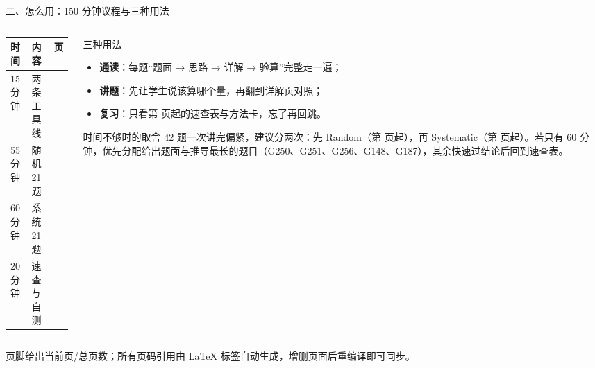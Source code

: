 \documentclass[aspectratio=169,10pt,fontset=none]{ctexbeamer}
\begin{document}
\begin{frame}[t]{二、怎么用：150 分钟议程与三种用法}
  \label{sec:agenda}
  \begin{columns}[T,onlytextwidth]
    \begin{column}{0.54\textwidth}
      \centering
      \scriptsize
      \setlength{\tabcolsep}{3pt}
      \renewcommand{\arraystretch}{1.2}
      \begin{tabular}{@{}l l r@{}}
        \toprule
        时间 & 内容 & 页\\
        \midrule
        15 分钟 & 两条工具线 & \pageref{sec:framework1}\\
        55 分钟 & 随机 21 题 & \pageref{sec:random}\\
        60 分钟 & 系统 21 题 & \pageref{sec:sys}\\
        20 分钟 & 速查与自测 & \pageref{sec:answers}\\
        \bottomrule
      \end{tabular}
    \end{column}
    \begin{column}{0.43\textwidth}
      \begin{block}{\footnotesize 三种用法}
        \scriptsize
        \begin{itemize}\setlength{\itemsep}{1pt}
          \item \textbf{通读}：每题“题面 → 思路 → 详解 → 验算”完整走一遍；
          \item \textbf{讲题}：先让学生说该算哪个量，再翻到详解页对照；
          \item \textbf{复习}：只看第 \pageref{sec:answers} 页起的速查表与方法卡，忘了再回跳。
        \end{itemize}
      \end{block}
      \begin{alertblock}{\footnotesize 时间不够时的取舍}
        \scriptsize
        42 题一次讲完偏紧，建议分两次：先 Random（第 \pageref{sec:random} 页起），再 Systematic（第 \pageref{sec:sys} 页起）。若只有 60 分钟，优先分配给出题面与推导最长的题目（G250、G251、G256、G148、G187），其余快速过结论后回到速查表。
      \end{alertblock}
    \end{column}
  \end{columns}
  \vspace{0.2em}
  {\scriptsize\color{ink!70} 页脚给出当前页/总页数；所有页码引用由 \LaTeX{} 标签自动生成，增删页面后重编译即可同步。}
\end{frame}
\end{document}
